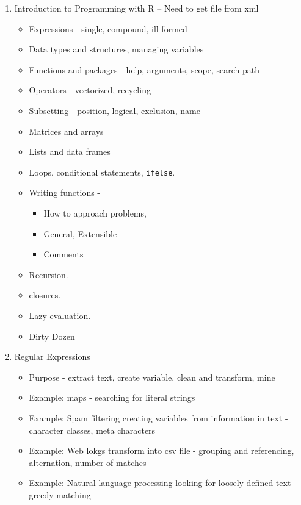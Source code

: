\documentclass[11pt,timesroman]{article}
\begin{document}
\begin{enumerate}
\item{Introduction to Programming with R -- Need to get file from xml}
        \begin{itemize}
        \item Expressions - single, compound, ill-formed
        \item Data types and structures, managing variables
        \item Functions and packages - help, arguments, scope, search path
        \item Operators - vectorized, recycling
        \item Subsetting - position, logical, exclusion, name
        \item Matrices and arrays
        \item Lists and data frames
        \item Loops, conditional statements, \texttt{ifelse}.
        \item Writing functions - 
                \begin{itemize}
                \item How to approach problems,
                \item General, Extensible
                \item Comments
                \end{itemize}
        \item Recursion.
        \item closures.
        \item Lazy evaluation.
        \item Dirty Dozen
        \end{itemize}


\item{Regular Expressions} 
    \begin{itemize}
      \item Purpose - extract text, create variable, clean and transform, mine
      \item Example: maps - searching for literal strings
      \item Example: Spam filtering creating variables from information in text - character classes, meta characters
      \item Example: Web lokgs transform into csv file - grouping and referencing, alternation, number of matches
      \item Example: Natural language processing looking for loosely defined text - greedy matching
    \end{itemize}


\end{enumerate}
\end{document}
